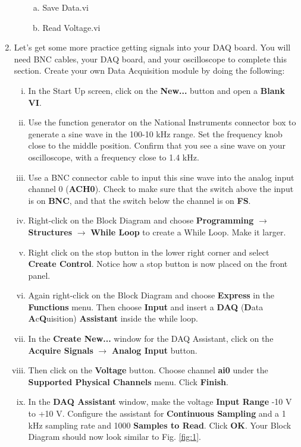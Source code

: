 \documentclass[12pt]{article}
\begin{document}
\begin{enumerate}[1.]
\begin{enumerate}[i.]
\begin{enumerate}[a.]
			\item Save Data.vi
			\item Read Voltage.vi
		\end{enumerate}
	\end{enumerate}
	\item Let's get some more practice getting signals into your DAQ board. You will need BNC cables, your DAQ board, and your oscilloscope to complete this section. Create your own Data Acquisition module by doing the following:
	\begin{enumerate}[i.]
		\item In the Start Up screen, click on the \textbf{New...} button and open a \textbf{Blank VI}.
		\item Use the function generator on the National Instruments connector box to generate a sine wave in the 100-10 kHz range. Set the frequency knob close to the middle position. Confirm that you see a sine wave on your oscilloscope, with a frequency close to 1.4 kHz.
		\item Use a BNC connector cable to input this sine wave into the analog input channel 0 (\textbf{ACH0}). Check to make sure that the switch above the input is on \textbf{BNC}, and that the switch below the channel is on \textbf{FS}.
		\item Right-click on the Block Diagram and choose \textbf{Programming} $\rightarrow$ \textbf{Structures} $\rightarrow$ \textbf{While Loop} to create a While Loop. Make it larger.
		\item Right click on the stop button in the lower right corner and select {\bf Create Control}. Notice how a stop button is now placed on the front panel.
		\item Again right-click on the Block Diagram and choose \textbf{Express} in the \textbf{Functions} menu. Then choose \textbf{Input} and insert a \textbf{DAQ} (\textbf{D}ata \textbf{A}c\textbf{Q}uisition) \textbf{Assistant} inside the while loop.
		\item In the \textbf{Create New...} window for the DAQ Assistant, click on the {\bf Acquire Signals} $\rightarrow$ \textbf{Analog Input} button.
		\item Then click on the \textbf{Voltage} button. Choose channel \textbf{ai0} under the \textbf{Supported Physical Channels} menu. Click \textbf{Finish}.
		\item In the \textbf{DAQ Assistant} window, make the voltage \textbf{Input Range} -10 V to +10 V. 
		Configure the assistant for \textbf{Continuous Sampling} and a 1 kHz sampling rate and 1000 {\bf Samples to Read}. Click \textbf{OK}. Your Block Diagram should now look similar to Fig. \ref{fig:1}.
	\end{enumerate}
	

\end{enumerate}
\end{document}
